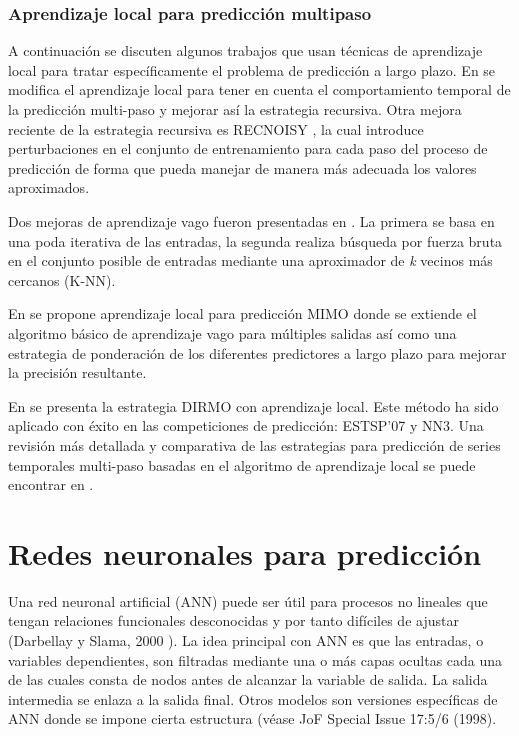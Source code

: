 \documentclass{llncs}
\begin{document}
\subsubsection{Aprendizaje local para predicción multipaso\\}
A continuación se discuten algunos trabajos que usan técnicas de aprendizaje local para tratar específicamente el problema de predicción a largo plazo.  En \cite{McNames1998112} \cite{Bontempi199932} se modifica el aprendizaje local para tener en cuenta el comportamiento temporal de la predicción multi-paso y mejorar así la estrategia recursiva. Otra mejora reciente de la estrategia recursiva es RECNOISY \cite{BenTaieb2011}, la cual introduce perturbaciones en el conjunto de entrenamiento para cada paso del proceso de predicción de forma que pueda manejar de manera más adecuada los valores aproximados. 

Dos mejoras de aprendizaje vago fueron presentadas en \cite{Sorjamaa2005509}. La primera se basa en una poda iterativa de las entradas, la segunda realiza búsqueda por fuerza bruta en el conjunto posible de entradas mediante una aproximador de \emph{k} vecinos más cercanos (K-NN).

En \cite{Bontempi2008145} se propone aprendizaje local para predicción MIMO donde se extiende el algoritmo básico de aprendizaje vago para múltiples salidas así como una estrategia de ponderación de los diferentes predictores a largo plazo para mejorar la precisión resultante.

En  \cite{BenTaieb2009}  \cite{BenTaieb20101950} se presenta la estrategia DIRMO con aprendizaje local. Este método ha sido aplicado con éxito en las competiciones de predicción: ESTSP'07 \cite{BenTaieb2009} y NN3\cite{BenTaieb20101950}.
Una revisión más detallada y comparativa de las estrategias para predicción de series temporales multi-paso basadas en el algoritmo de aprendizaje local se puede encontrar en \cite{Roberts1982808}.


\section{Redes neuronales para predicción}

Una red neuronal artificial (ANN) puede ser útil para procesos no lineales que tengan relaciones funcionales desconocidas y por tanto difíciles de ajustar (Darbellay y Slama, 2000 \cite{Darbellay200071}). La idea principal con ANN es que las entradas, o variables dependientes, son filtradas mediante una o más capas ocultas cada una de las cuales consta de nodos antes de alcanzar la variable de salida. La salida intermedia se enlaza a la salida final. Otros modelos son versiones específicas de ANN donde se impone cierta estructura (véase JoF Special Issue 17:5/6 (1998).
\end{document}
